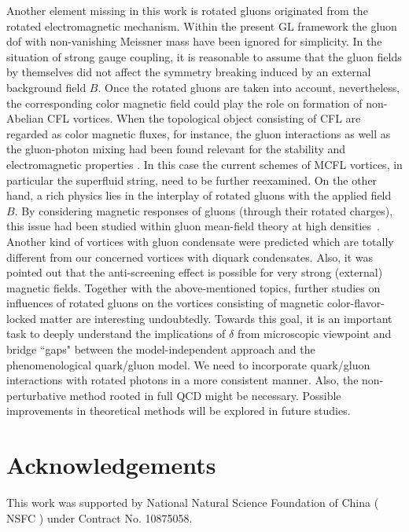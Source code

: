 \documentclass[prd, showpacs,nofootinbib,amsmath,amssymb]{revtex4}
\begin{document}
Another element missing in this work is rotated gluons originated from the rotated electromagnetic mechanism. Within the present GL framework the gluon dof with non-vanishing Meissner mass have been ignored for simplicity. 
In the situation of strong gauge coupling, it is reasonable to assume that the gluon fields by themselves did not affect the symmetry breaking induced by an external background field $B$. Once the rotated gluons are taken into account, nevertheless,  the corresponding color magnetic field could play the role on formation of non-Abelian CFL vortices. When the topological object consisting of CFL are regarded as color magnetic fluxes, for instance, the gluon interactions as well as the gluon-photon mixing had been found relevant for the stability and electromagnetic properties \cite{vinci2012spontaneous,eto2010instabilities,iida2005magnetic}.
In this case the current schemes of MCFL vortices, in particular the superfluid string, need to be further reexamined.
On the other hand, a rich physics lies in the interplay of rotated gluons with the applied field $B$.
By considering magnetic responses of gluons (through their rotated charges), this issue had been studied within gluon mean-field theory at high densities~\cite{ferrer2006magnetic}. 
Another kind of vortices with gluon condensate were predicted which are totally different from our concerned vortices with diquark condensates. Also, it was pointed out that the anti-screening effect is possible for very strong (external) magnetic fields. 
Together with the above-mentioned topics, further studies on influences of rotated gluons on the vortices consisting of magnetic color-flavor-locked matter are interesting undoubtedly. Towards this goal, it is an important task to deeply understand the implications of $\delta$ from microscopic viewpoint and bridge ``gaps" between the model-independent approach and the phenomenological quark/gluon model. We need to incorporate quark/gluon interactions with rotated photons in a more consistent manner. Also, the non-perturbative method rooted in full QCD might be necessary. Possible improvements in theoretical methods will be explored in future studies.



\section*{Acknowledgements}

This work was supported by National Natural Science Foundation of
China ( NSFC ) under Contract No. 10875058.
\end{document}
